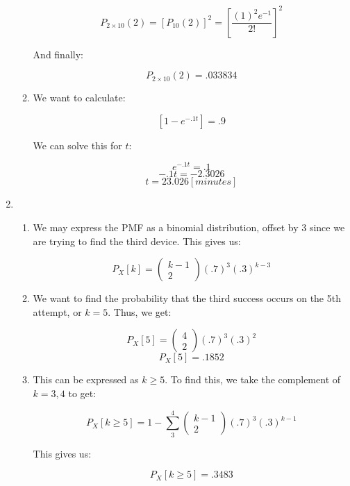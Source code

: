 \begin{enumerate}
\begin{enumerate}
        $$P_{2\times10}(2)=[P_{10}(2)]^2=\left[\frac{(1)^2e^{-1}}{2!}\right]^2$$

        And finally:

        $$\boxed{P_{2\times10}(2)=.033834}$$

      \item We want to calculate:

        $$\left[ 1-e^{-.1t} \right]=.9$$

        We can solve this for $t$:

        $$e^{-.1t}=.1$$
        $$-.1t=-2.3026$$
        $$\boxed{t=23.026\left[ \si{minutes} \right]}$$

    \end{enumerate}

  \item 

    \begin{enumerate}

      \item We may express the PMF as a binomial distribution, offset by $3$ since we are trying to find the third device. This gives us:

        $$\boxed{P_X[k]=\left( \begin{matrix} k-1\\2\end{matrix} \right)(.7)^3(.3)^{k-3}}$$

      \item We want to find the probability that the third success occurs on the 5th attempt, or $k=5$. Thus, we get:

        $$P_X[5]=\left( \begin{matrix} 4\\2\end{matrix} \right)(.7)^3(.3)^{2}$$
        $$\boxed{P_X[5]=.1852}$$

      \item This can be expressed as $k\geq 5$. To find this, we take the complement of $k=3,4$ to get:

        $$P_X[k\geq5]= 1-\sum_{3}^4\left( \begin{matrix}k-1\\2\end{matrix} \right)(.7)^3(.3)^{k-1}$$

        This gives us:

        $$\boxed{P_X[k\geq5]= .3483}$$

    \end{enumerate}


\end{enumerate}
